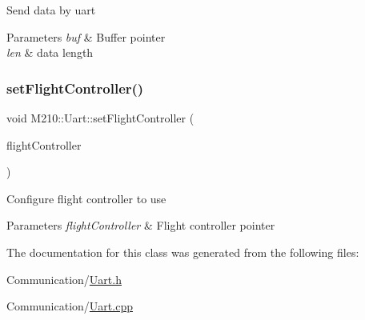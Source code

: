 Send data by uart 
\begin{DoxyParams}{Parameters}
{\em buf} & Buffer pointer \\
\hline
{\em len} & data length \\
\hline
\end{DoxyParams}
\mbox{\label{class_m210_1_1_uart_a294e7c110b8bb09dd7b4fde43ed1fce4}} 
\subsubsection{\texorpdfstring{set\+Flight\+Controller()}{setFlightController()}}
{\footnotesize\ttfamily void M210\+::\+Uart\+::set\+Flight\+Controller (\begin{DoxyParamCaption}\item[{const \mbox{\hyperlink{class_m210_1_1_flight_controller}{Flight\+Controller}} $\ast$}]{flight\+Controller }\end{DoxyParamCaption})\hspace{0.3cm}{\ttfamily [inline]}}

Configure flight controller to use 
\begin{DoxyParams}{Parameters}
{\em flight\+Controller} & Flight controller pointer \\
\hline
\end{DoxyParams}


The documentation for this class was generated from the following files\+:\begin{DoxyCompactItemize}
\item 
Communication/\mbox{\hyperlink{_uart_8h}{Uart.\+h}}\item 
Communication/\mbox{\hyperlink{_uart_8cpp}{Uart.\+cpp}}\end{DoxyCompactItemize}
